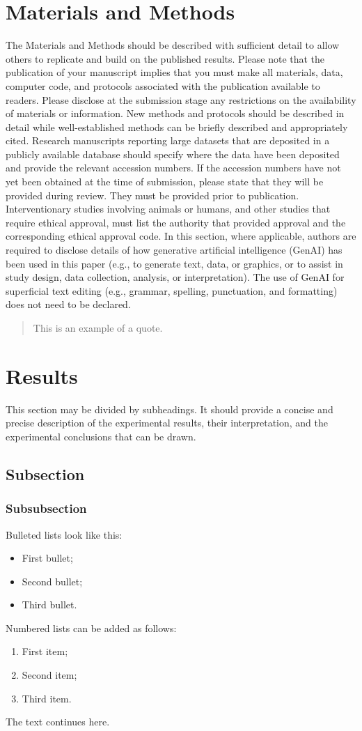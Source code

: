 ﻿\documentclass[journal,article,submit,moreauthors]{Definitions/mdpi}
\begin{document}
\section{Materials and Methods}
The Materials and Methods should be described with sufficient detail to allow others to replicate and build on the published results. Please note that the publication of your manuscript implies that you must make all materials, data, computer code, and protocols associated with the publication available to readers. Please disclose at the submission stage any restrictions on the availability of materials or information. New methods and protocols should be described in detail while well-established methods can be briefly described and appropriately cited.
Research manuscripts reporting large datasets that are deposited in a publicly available database should specify where the data have been deposited and provide the relevant accession numbers. If the accession numbers have not yet been obtained at the time of submission, please state that they will be provided during review. They must be provided prior to publication.
Interventionary studies involving animals or humans, and other studies that require ethical approval, must list the authority that provided approval and the corresponding ethical approval code.
In this section, where applicable, authors are required to disclose details of how generative artificial intelligence (GenAI) has been used in this paper (e.g., to generate text, data, or graphics, or to assist in study design, data collection, analysis, or interpretation). The use of GenAI for superficial text editing (e.g., grammar, spelling, punctuation, and formatting) does not need to be declared.
\begin{quote}
This is an example of a quote.
\end{quote}
\section{Results}
This section may be divided by subheadings. It should provide a concise and precise description of the experimental results, their interpretation, and the experimental conclusions that can be drawn.
\subsection{Subsection}
\subsubsection{Subsubsection}
Bulleted lists look like this:
\begin{itemize}
\item	First bullet;
\item	Second bullet;
\item	Third bullet.
\end{itemize}
Numbered lists can be added as follows:
\begin{enumerate}
\item	First item; 
\item	Second item;
\item	Third item.
\end{enumerate}
The text continues here.
\end{document}
